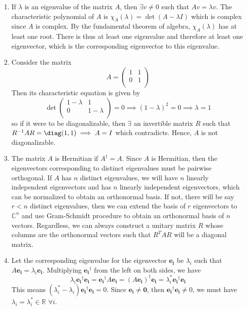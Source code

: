\documentclass[a4paper]{article}
\begin{document}
\begin{ans}\leavevmode
\begin{enumerate}[label=(\alph*)]
\item If $\lambda$ is an eigenvalue of the matrix $A$, then $\exists v\neq 0$ such that $Av=\lambda v$. The characteristic polynomial of $A$ is $\chi_A(\lambda)=\det(A-\lambda I)$ which is complex since $A$ is complex. By the fundamental theorem of algebra, $\chi_A(\lambda)$ has at least one root. There is thus at least one eigenvalue and therefore at least one eigenvector, which is the corresponding eigenvector to this eigenvalue.
\item Consider the matrix
$$A=\begin{pmatrix}1&1\\0&1\\\end{pmatrix}$$
Then its characteristic equation is given by
$$\det\begin{pmatrix}1-\lambda&1\\0&1-\lambda\\\end{pmatrix}=0\implies(1-\lambda)^2=0\implies\lambda=1$$
so if it were to be diagonalizable, then $\exists$ an invertible matrix $R$ such that $R^{-1}AR=\diag(1,1)\implies A=I$ which contradicts. Hence, $A$ is not diagonalizable.
\item The matrix $A$ is Hermitian if $A^\dag=A$. Since $A$ is Hermitian, then the eigenvectors corresponding to distinct eigenvalues must be pairwise orthogonal. If $A$ has $n$ distinct eigenvalues, we will have $n$ linearly independent eigenvectors and has $n$ linearly independent eigenvectors, which can be normalized to obtain an orthonormal basis. If not, there will be say $r<n$ distinct eigenvalues, then we can extend the basis of $r$ eigenvectors to $\mathbb{C}^n$ and use Gram-Schmidt procedure to obtain an orthonormal basis of $n$ vectors. Regardless, we can always construct a unitary matrix $R$ whose columns are the orthonormal vectors such that $R^TAR$ will be a diagonal matrix.
\item Let the corresponding eigenvalue for the eigenvector $\mathbf{e_i}$ be $\lambda_i$ such that $A\mathbf{e_i}=\lambda_i\mathbf{e_i}$. Multiplying $\mathbf{e_i}^\dag$ from the left on both sides, we have
$$\lambda_i\mathbf{e_i}^\dag\mathbf{e_i}=\mathbf{e_i}^\dag A\mathbf{e_i}=(A\mathbf{e_i})^\dag\mathbf{e_i}=\lambda_i^*\mathbf{e_i}^\dag\mathbf{e_i}$$
This means $(\lambda_i^*-\lambda_i)\mathbf{e_i}^\dag\mathbf{e_i}=0$. Since $\mathbf{e_i}\neq\boldsymbol{0}$, then $\mathbf{e_i}^\dag\mathbf{e_i}\neq0$, we must have $\lambda_i=\lambda_i^*\in\mathbb{R}$ $\forall i$.

\end{enumerate}
\end{ans}
\end{document}

